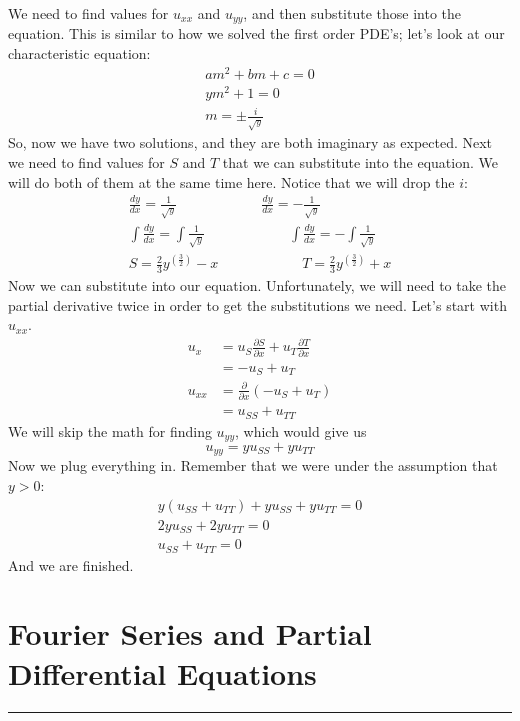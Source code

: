 \documentclass{article}
\begin{document}
We need to find values for $u_{xx}$ and $u_{yy}$, and then substitute those into
the equation. This is similar to how we solved the first order PDE's; let's look
at our characteristic equation:
\begin{gather*}
am^{2} + bm + c = 0\\
ym^{2} + 1 = 0\\
m = \pm \frac{i}{\sqrt{y}}
\end{gather*}
\noindent So, now we have two solutions, and they are both imaginary as expected.
Next we need to find values for $S$ and $T$ that we can substitute into the
equation. We will do both of them at the same time here. Notice that we will
drop the $i$:
\begin{gather*}
\frac{dy}{dx} = \frac{1}{\sqrt{y}} \qquad\qquad\qquad \frac{dy}{dx} = -\frac{1}{\sqrt{y}}\\
\int\frac{dy}{dx} =\int\frac{1}{\sqrt{y}} \qquad\qquad\qquad \int\frac{dy}{dx} = -\int\frac{1}{\sqrt{y}}\\
S = \frac{2}{3}y^{\left(\frac{3}{2}\right)} - x \qquad\qquad\qquad T = \frac{2}{3}y^{\left(\frac{3}{2}\right)} + x
\end{gather*}
\noindent Now we can substitute into our equation. Unfortunately, we will need
to take the partial derivative twice in order to get the substitutions we need.
Let's start with $u_{xx}$.
\begin{align*}
u_{x} &= u_{S}\frac{\partial S}{\partial x} + u_{T}\frac{\partial T}{\partial x}\\
&= -u_{S} + u_{T}\\
u_{xx} &= \frac{\partial}{\partial x}(-u_{S} + u_{T})\\
&= u_{SS} + u_{TT}
\end{align*}
\noindent We will skip the math for finding $u_{yy}$, which would give us
\[
u_{yy} = yu_{SS} + yu_{TT}
\]
\noindent Now we plug everything in. Remember that we were under the assumption
that $y > 0$:
\begin{gather*}
y(u_{SS} + u_{TT}) + yu_{SS} + yu_{TT} = 0\\
2yu_{SS} + 2yu_{TT} = 0\\
u_{SS} + u_{TT} = 0
\end{gather*}
\noindent And we are finished.


\newpage
\section{Fourier Series and Partial Differential Equations}
\hrule
\noindent\\
\end{document}
